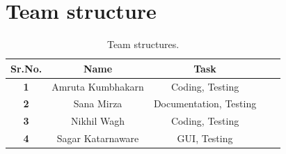 \section{\normalsize{\textbf{Team structure}}} 
\begin{table}[h]
\label{sch}
\begin{center}
\begin{tabular}{|c|c|c|c|c|} \hline
		\bfseries Sr.No. & \bfseries Name & \bfseries Task \\ \hline
    \bfseries 1 & Amruta Kumbhakarn &  Coding, Testing \\ \hline
		\bfseries 2 & Sana Mirza &  Documentation, Testing  \\ \hline
		\bfseries 3 & Nikhil Wagh & Coding, Testing  \\ \hline
		\bfseries 4 & Sagar Katarnaware & GUI, Testing  \\ \hline
\end{tabular}
\end{center}
\caption {Team structures.}
\end{table}





